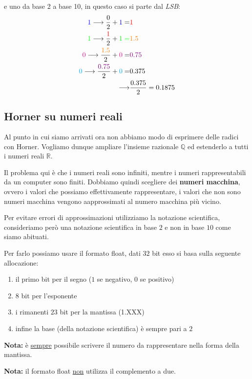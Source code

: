 \documentclass[../main.tex]{subfiles}
\begin{document}
e uno da base 2 a base 10, in questo caso si parte dal \textit{LSB}:
\begin{align*}
    \color{blue}1\color{black} \longrightarrow \frac{0}{2} + \color{blue}1\color{black} =& \color{red}1\\
    \color{green}1\color{black} \longrightarrow \frac{\color{red}1\color{black}}{2} + \color{green}1\color{green} =& \color{orange}1.5\color{black}\\
    \color{magenta}0\color{black} \longrightarrow \frac{\color{orange}1.5\color{black}}{2} + \color{magenta}0\color{black} =& \color{violet}0.75\color{black}\\
    \color{cyan}0\color{black} \longrightarrow \frac{\color{violet}0.75\color{black}}{2} + \color{cyan}0\color{black} =& 0.375\\
    \longrightarrow& \frac{0.375}{2} = 0.1875\\
\end{align*}

\pagebreak
\subsection{Horner su numeri reali}
Al punto in cui siamo arrivati ora non abbiamo modo di esprimere delle radici con Horner. Vogliamo dunque ampliare l'insieme razionale
$\mathbb{Q}$ ed estenderlo a tutti i numeri reali $\mathbb{R}$.

Il problema qui è che i numeri reali sono infiniti, mentre i numeri rappresentabili da un computer sono finiti. Dobbiamo quindi scegliere
dei \textbf{numeri macchina}, ovvero i valori che possiamo effettivamente rappresentare, i valori che non sono numeri macchina vengono 
aapprossimati al numero macchina più vicino.

\vspace{1cm}
Per evitare errori di approssimazioni utilizziamo la notazione scientifica, consideriamo però una notazione scientifica in 
base $2$ e non in base $10$ come siamo abituati.

Per farlo possiamo usare il formato float, dati $32$ bit esso si basa sulla seguente allocazione:
\begin{enumerate}
    \item il primo bit per il segno ($1$ se negativo, $0$ se positivo)
    \item $8$ bit per l'esponente
    \item i rimanenti $23$ bit per la mantissa (1.XXX)
    \item infine la base (della notazione scientifica) è sempre pari a $2$
\end{enumerate}
\textbf{Nota:} è \underline{sempre} possibile scrivere il numero da rappresentare nella forma della mantissa.

\textbf{Nota:} il formato float \underline{non} utilizza il complemento a due.
\end{document}
